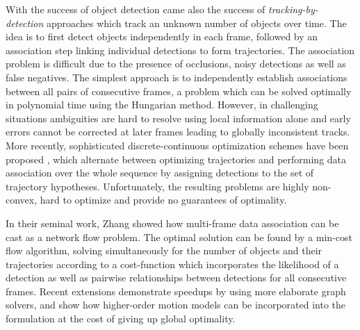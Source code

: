 \documentclass[10pt,twocolumn,letterpaper]{article}
\begin{document}
With the success of object detection came also the success of {\it tracking-by-detection} approaches \cite{Zhang2008CVPR,Pirsiavash2011CVPR,Andriyenko2012CVPR,Breitenstein2011PAMI,Leibe2007CVPR,Yang2012CVPR,Milan2013CVPR,Butt2013CVPR,Segal2013ICCV} which track an unknown number of objects over time. The idea is to first detect objects independently in each frame, followed by an association step linking individual detections to form trajectories. The association problem is  difficult due to the presence of occlusions, noisy detections as well as false negatives. 
The simplest approach is to independently establish associations between all pairs of consecutive frames, a problem which can be solved optimally in polynomial time using the Hungarian method. However, in challenging situations ambiguities are hard to resolve using local information alone and early errors cannot be corrected at later frames leading to globally inconsistent tracks. More recently, sophisticated discrete-continuous optimization schemes have been proposed \cite{Andriyenko2012CVPR}, which alternate between optimizing trajectories and performing data association over the whole sequence by assigning detections to the  set of trajectory hypotheses. Unfortunately, the resulting problems are highly non-convex, hard to optimize and provide no guarantees of optimality.

In their seminal work, Zhang \etal \cite{Zhang2008CVPR} showed how multi-frame data association can be cast as a network flow problem. 
The optimal solution can be found by a min-cost flow algorithm, solving simultaneously for the number of objects and their trajectories according to a cost-function which incorporates the likelihood of a detection as well as pairwise relationships between detections for all consecutive frames. Recent extensions \cite{Berclaz2011PAMI,Pirsiavash2011CVPR,Butt2013CVPR,Arora2013ICCV} demonstrate speedups by using more elaborate graph solvers, and show how higher-order motion models can be incorporated into the formulation at the cost of giving up global optimality.
\end{document}

